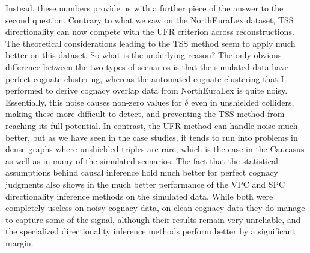 Instead, these numbers provide us with a further piece of the answer to the second question. Contrary to what we saw on the NorthEuraLex dataset, TSS directionality can now compete with the UFR criterion across reconstructions. The theoretical considerations leading to the TSS method seem to apply much better on this dataset. So what is the underlying reason? The only obvious difference between the two types of scenarios is that the simulated data have perfect cognate clustering, whereas the automated cognate clustering that I performed to derive cognacy overlap data from NorthEuraLex is quite noisy. Essentially, this noise causes non-zero values for $\delta$ even in unshielded colliders, making these more difficult to detect, and preventing the TSS method from reaching its full potential. In contrast, the UFR method can handle noise much better, but as we have seen in the case studies, it tends to run into problems in dense graphs where unshielded triples are rare, which is the case in the Caucasus as well as in many of the simulated scenarios. The fact that the statistical assumptions behind causal inference hold much better for perfect cognacy judgments also shows in the much better performance of the VPC and SPC directionality inference methods on the simulated data. While both were completely useless on noisy cognacy data, on clean cognacy data they do manage to capture some of the signal, although their results remain very unreliable, and the specialized directionality inference methods perform better by a significant margin.

